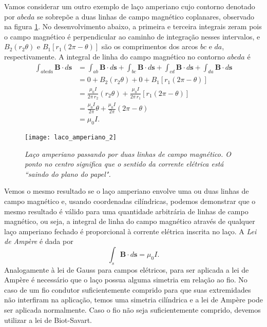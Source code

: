 Vamos considerar um outro exemplo de laço amperiano cujo contorno denotado por $abcda$ se sobrepõe a duas linhas de campo magnético coplanares, observado na figura \ref{fig.laco_amper_2}. No desenvolvimento abaixo, a primeira e terceira integrais zeram pois o campo magnético é perpendicular ao caminho de integração nesses intervalos, e $B_2(r_2\theta)$ e $B_1[r_1(2\pi-\theta)]$ são os comprimentos dos arcos $bc$ e $da$, respectivamente. A integral de linha do campo magnético no contorno $abcda$ é
\begin{align*}
\int_{abcda}\textbf{B}\cdot d\textbf{s}&=\int_{ab}\textbf{B}\cdot d\textbf{s}+\int_{bc}\textbf{B}\cdot d\textbf{s}+\int_{cd}\textbf{B}\cdot d\textbf{s}+\int_{da}\textbf{B}\cdot d\textbf{s}\\
&=0+B_2(r_2\theta)+0+B_1[r_1(2\pi-\theta)]\\
&=\frac{\mu_0I}{2\pi\,r_2}(r_2\theta)+\frac{\mu_0I}{2\pi\,r_1}[r_1(2\pi-\theta)]\\
&=\frac{\mu_0I}{2\pi}\theta+\frac{\mu_0I}{2\pi}(2\pi-\theta)\\
&=\mu_0I.
\end{align*}
\begin{figure}
\centering
\texttt{[image: laco\_amperiano\_2]}
\caption{\textit{Laço amperiano passando por duas linhas de campo magnético. O ponto no centro significa que o sentido da corrente elétrica está ``saindo do plano do papel".}}
\label{fig.laco_amper_2}
\end{figure}
Vemos o mesmo resultado se o laço amperiano envolve uma ou duas linhas de campo magnético e, usando coordenadas cilíndricas, podemos demonstrar que o mesmo resultado é válido para uma quantidade arbitrária de linhas de campo magnético, ou seja, a integral de linha do campo magnético através de qualquer laço amperiano fechado é proporcional à corrente elétrica inscrita no laço. A \textit{Lei de Ampère} é dada por
\begin{equation*}
\int_{s}\textbf{B}\cdot d\textbf{s}=\mu_0I.
\end{equation*}
Analogamente à lei de Gauss para campos elétricos, para ser aplicada a lei de Ampère é necessário que o laço possua alguma simetria em relação ao fio. No caso de um fio condutor suficientemente comprido para que suas extremidades não interfiram na aplicação, temos uma simetria cilíndrica e a lei de Ampère pode ser aplicada normalmente. Caso o fio não seja suficientemente comprido, devemos utilizar a lei de Biot-Savart. 

